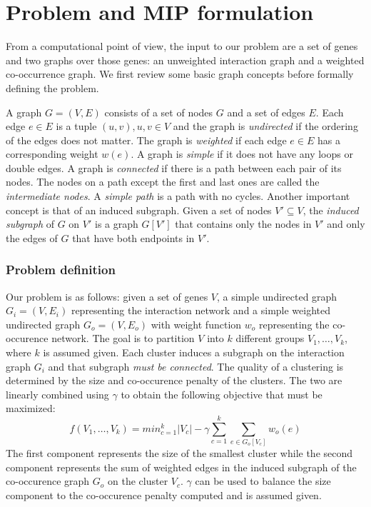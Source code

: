 \documentclass[conference]{IEEEtran}
\begin{document}
\section{Problem and MIP formulation}
\label{sec:definition}

From a computational point of view, the input to our problem are a set of genes and two graphs over those genes: an unweighted interaction graph and a weighted co-occurrence graph. We first review some basic graph concepts before formally defining the problem.

A graph $G=(V, E)$ consists of a set of nodes $G$ and a set of edges $E$. Each edge $e \in E$ is a tuple $(u,v), u,v \in V$ and the graph is \textit{undirected} if the ordering of the edges does not matter. The graph is \textit{weighted} if each edge $e \in E$ has a corresponding weight $w(e)$.
A graph is \emph{simple} if it does not have any loops or double edges.
A graph is \emph{connected} if there is a path between each pair of its nodes. The nodes on a path except the first and last ones are called the \emph{intermediate nodes}. A \emph{simple path} is a path with no cycles. Another important concept is that of an induced subgraph. Given a set of nodes $V' \subseteq V$, the \textit{ induced subgraph} of $G$ on $V'$ is a graph $G[V']$ that contains only the nodes in $V'$ and only the edges of $G$ that have both endpoints in $V'$. 

\subsubsection{Problem definition}
Our problem is as follows: given a set of genes $V$, a simple undirected graph $G_i=(V,E_i)$ representing the interaction network and a simple weighted undirected graph $G_o=(V,E_o)$ with weight function $w_o$ representing the co-occurence network. The goal is to partition $V$ into $k$ different groups $V_1,\ldots,V_k$, where $k$ is assumed given. Each cluster induces a subgraph on the interaction graph $G_i$ and that subgraph \textit{must be connected}. The quality of a clustering is determined by the size and co-occurence penalty of the clusters. The two are linearly combined using $\gamma$ to obtain the following objective that must be maximized:
\begin{equation}
f(V_1,\ldots,V_k) = min_{c=1}^{k} |V_c| - \gamma \sum_{c=1}^{k} \sum_{e \in G_o[V_c]} w_o(e) \label{eq:def}
\end{equation}
The first component represents the size of the smallest cluster while the second component represents the sum of weighted edges in the induced subgraph of the co-occurence graph $G_o$ on the cluster $V_c$. $\gamma$ can be used to balance the size component to the co-occurence penalty computed and is assumed given.
\end{document}
